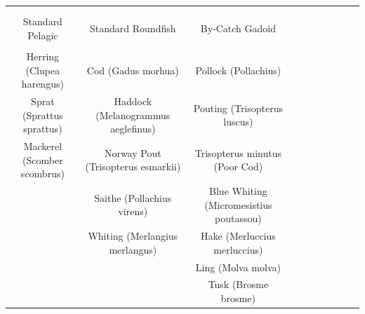 \documentclass[a4paper 12pt]{article}
\numberwithin{equation}{section}
\begin{document}
\begin{small}
\begin{table}[h!]
\centering
\setlength\tabcolsep{1.5pt} 
\begin{tabular}{cccccccccc}
\hline \\
\multicolumn{2}{c}{} \\
Standard Pelagic               & Standard Roundfish & By-Catch Gadoid       \\[1.5ex]
\hline \\[0.1ex]
Herring (Clupea harengus) &  Cod (Gadus morhua)  & Pollock (Pollachius)      \\[1.5ex]
Sprat (Sprattus sprattus)   &Haddock (Melanogrammus aeglefinus) & Pouting (Trisopterus luscus) \\[1.5ex]
Mackerel (Scomber scombrus) & Norway Pout (Trisopterus esmarkii) & Trisopterus minutus (Poor Cod) \\[1.5ex]
 & Saithe (Pollachius virens)  & Blue Whiting (Micromesistius poutassou)   \\[1.5ex]
&Whiting (Merlangius merlangus)  & Hake (Merluccius merluccius)  \\[1.5ex]
& &  Ling (Molva molva) \\[1.5ex]
& &  Tusk (Brosme brosme) \\[0.5ex]
\hline
\end{tabular}
\end{table}
\end{small}
\end{document}
